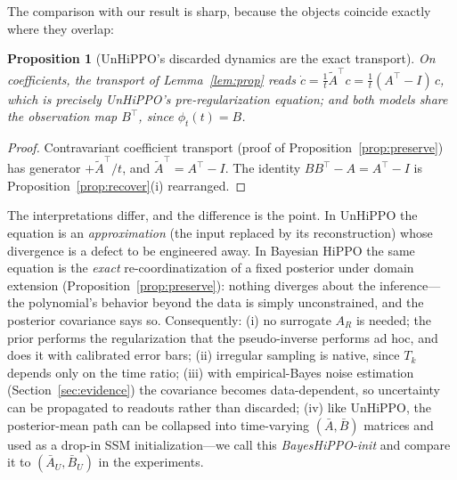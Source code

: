 \documentclass[11pt]{article}
\newtheorem{proposition}{Proposition}
\newcommand{\At}{\widetilde{A}}
\begin{document}
The comparison with our result is sharp, because the objects coincide exactly where they overlap:

\begin{proposition}[UnHiPPO's discarded dynamics are the exact transport]
On coefficients, the transport of Lemma~\ref{lem:prop} reads $\dot c=\tfrac1t\At^\top c=\tfrac1t(A^\top-I)\,c$, which is precisely UnHiPPO's pre-regularization equation; and both models share the observation map $B^\top$, since $\phi_t(t)=B$.
\end{proposition}
\begin{proof}
Contravariant coefficient transport (proof of Proposition~\ref{prop:preserve}) has generator $+\At^\top/t$, and $\At^\top=A^\top-I$. The identity $BB^\top-A=A^\top-I$ is Proposition~\ref{prop:recover}(i) rearranged.
\end{proof}

The interpretations differ, and the difference is the point. In UnHiPPO the equation is an \emph{approximation} (the input replaced by its reconstruction) whose divergence is a defect to be engineered away. In Bayesian HiPPO the same equation is the \emph{exact} re-coordinatization of a fixed posterior under domain extension (Proposition~\ref{prop:preserve}): nothing diverges about the inference---the polynomial's behavior beyond the data is simply unconstrained, and the posterior covariance says so. Consequently: (i) no surrogate $A_R$ is needed; the prior performs the regularization that the pseudo-inverse performs ad hoc, and does it with calibrated error bars; (ii) irregular sampling is native, since $T_k$ depends only on the time ratio; (iii) with empirical-Bayes noise estimation (Section~\ref{sec:evidence}) the covariance becomes data-dependent, so uncertainty can be propagated to readouts rather than discarded; (iv) like UnHiPPO, the posterior-mean path can be collapsed into time-varying $(\bar A,\bar B)$ matrices and used as a drop-in SSM initialization---we call this \emph{BayesHiPPO-init} and compare it to $(\bar A_U,\bar B_U)$ in the experiments.
\end{document}
